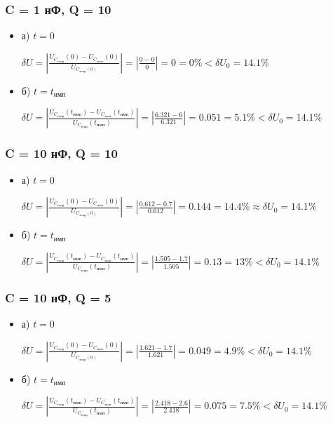 \documentclass[a4paper,14pt]{extarticle}
\begin{document}
\subsubsection{C = 1 нФ, Q = 10}

\begin{itemize}
	\item[] а) $t = 0$

	$\delta U = \left| \frac{U_{C_\text{теор}}(0) - U_{C_\text{эксп}}(0)}{U_{C_\text{теор}(0)}} \right| = \left| \frac{0 - 0}{0} \right| = 0 = 0\% < \delta U_0 = 14.1\%$

	\item[] б) $t = t_\text{имп}$

	$\delta U = \left| \frac{U_{C_\text{теор}}(t_\text{имп}) - U_{C_\text{эксп}}(t_\text{имп})}{U_{C_\text{теор}}(t_\text{имп})} \right| = \left| \frac{6.321 - 6}{6.321} \right| = 0.051 = 5.1\% < \delta U_0 = 14.1\%$
\end{itemize}

\subsubsection{C = 10 нФ, Q = 10}

\begin{itemize}
	\item[] а) $t = 0$

	$\delta U = \left| \frac{U_{C_\text{теор}}(0) - U_{C_\text{эксп}}(0)}{U_{C_\text{теор}(0)}} \right| = \left| \frac{0.612 - 0.7}{0.612} \right| = 0.144 = 14.4\% \approx \delta U_0 = 14.1\%$

	\item[] б) $t = t_\text{имп}$

	$\delta U = \left| \frac{U_{C_\text{теор}}(t_\text{имп}) - U_{C_\text{эксп}}(t_\text{имп})}{U_{C_\text{теор}}(t_\text{имп})} \right| = \left| \frac{1.505 - 1.7}{1.505} \right| = 0.13 = 13\% < \delta U_0 = 14.1\%$
\end{itemize}

\subsubsection{C = 10 нФ, Q = 5}

\begin{itemize}
	\item[] а) $t = 0$

	$\delta U = \left| \frac{U_{C_\text{теор}}(0) - U_{C_\text{эксп}}(0)}{U_{C_\text{теор}(0)}} \right| = \left| \frac{1.621 - 1.7}{1.621} \right| = 0.049 = 4.9\% < \delta U_0 = 14.1\%$

	\item[] б) $t = t_\text{имп}$

	$\delta U = \left| \frac{U_{C_\text{теор}}(t_\text{имп}) - U_{C_\text{эксп}}(t_\text{имп})}{U_{C_\text{теор}}(t_\text{имп})} \right| = \left| \frac{2.418 - 2.6}{2.418} \right| = 0.075 = 7.5\% < \delta U_0 = 14.1\%$
\end{itemize}
\end{document}
